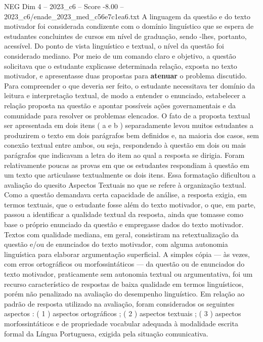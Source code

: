 \begin{textsample}{NEG Dim 4 – 2023\_c6 – Score -8.00 – 2023\_c6/enade\_2023\_med\_c56e7c1ea6.txt}
A linguagem da questão e do texto motivador foi considerada condizente com o domínio linguístico que se espera de estudantes concluintes de cursos em nível de graduação, sendo -lhes, portanto, acessível.
Do ponto de vista linguístico e textual, o nível da questão foi considerado mediano.
Por meio de um comando claro e objetivo, a questão solicitava que o estudante explicasse determinada relação, exposta no texto motivador, e apresentasse duas propostas para \textbf{atenuar} o problema discutido.
Para compreender o que deveria ser feito, o estudante necessitava ter domínio da leitura e interpretação textual, de modo a entender o enunciado, estabelecer a relação proposta na questão e apontar possíveis ações governamentais e da comunidade para resolver os problemas elencados.
O fato de a proposta textual ser apresentada em dois itens ( a e b ) separadamente levou muitos estudantes a produzirem o texto em dois parágrafos bem definidos e, na maioria dos casos, sem conexão textual entre ambos, ou seja, respondendo à questão em dois ou mais parágrafos que indicavam a letra do item ao qual a resposta se dirigia.
Foram relativamente poucas as provas em que os estudantes respondiam à questão em um texto que articulasse textualmente os dois itens.
Essa formatação dificultou a avaliação do quesito Aspectos Textuais no que se refere à organização textual.
Como a questão demandava certa capacidade de análise, a resposta exigia, em termos textuais, que o estudante fosse além do texto motivador, o que, em parte, passou a identificar a qualidade textual da resposta, ainda que tomasse como base o próprio enunciado da questão e empregasse dados do texto motivador.
Textos com qualidade mediana, em geral, consistiram na retextualização da questão e/ou de enunciados do texto motivador, com alguma autonomia linguística para elaborar argumentação superficial.
A simples cópia — às vezes, com erros ortográficos ou morfossintáticos — da questão ou de enunciados do texto motivador, praticamente sem autonomia textual ou argumentativa, foi um recurso característico de respostas de baixa qualidade em termos linguísticos, porém não penalizado na avaliação do desempenho linguístico.
Em relação ao padrão de resposta utilizado na avaliação, foram considerados os seguintes aspectos : ( 1 ) aspectos ortográficos ; ( 2 ) aspectos textuais ; ( 3 ) aspectos morfossintáticos e de propriedade vocabular adequada à modalidade escrita formal da Língua Portuguesa, exigida pela situação comunicativa.

\end{textsample}
